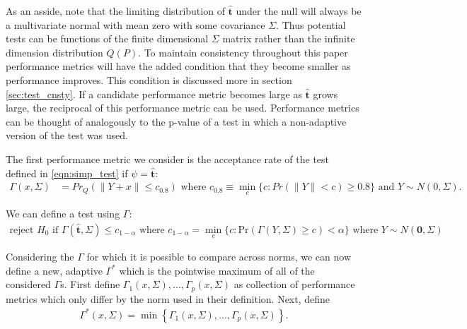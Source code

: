 \documentclass{article}
\newcommand{\vmat}{\Sigma}
\newcommand{\norm}{f}
\newcommand{\tst}{\hat{\boldsymbol{t}}}
\newcommand{\rvt}{Y}
\newcommand{\distv}{Q}
\newcommand{\Gammaf}{\Gamma_{\Sigma}}
\begin{document}
As an asside, note that the limiting distribution of $\tst$ under the null will always be a multivariate normal with mean zero with some covariance $\Sigma$. Thus potential tests can be functions of the finite dimensional $\Sigma$ matrix rather than the infinite dimension distribution $Q(P)$. To maintain consistency throughout this paper performance metrics will have the added condition that they become smaller as performance improves. This condition is discussed more in section \ref{sec:test_cnsty}. If a candidate performance metric becomes large as $\tst$ grows large, the reciprocal of this performance metric can be used. Performance metrics can be thought of analogously to the p-value of a test in which a non-adaptive version of the test was used.

The first performance metric we consider is the acceptance rate of the test defined in  \eqref{eqn:simp_test} if $\psi = \tst$: 
\begin{align}
	\Gamma(x, \Sigma) &= Pr_\distv(\|\rvt + x\| \leq c_{0.8})  \text{ where }  c_{0.8} \equiv \min_{c}\{c : Pr(\|\rvt\| < c) \geq 0.8 \} \text{ and } \rvt \sim N(0, \Sigma). \label{gamma:pow}
\end{align}

We can define a test using $\Gamma$: 
\begin{align*}
	\text{reject } H_0 \text{ if } \Gamma(\tst, \Sigma) \leq c_{1 - \alpha} \text { where } c_{1 - \alpha} = \min_{c}\{c : \text{Pr}(\Gamma(\rvt, \Sigma) \geq c) < \alpha\} \text{ where } \rvt \sim N(\boldsymbol{0}, \Sigma)
\end{align*}

Considering the $\Gamma$ for which it is possible to compare across norms, we can now define a new, adaptive $\Gamma^*$ which is the pointwise maximum of all of the considered $\Gamma$s. First define $\Gamma_{1}(x, \Sigma), \dots, \Gamma_{p}(x, \Sigma)$ as collection of performance metrics which only differ by the norm used in their definition. Next, define
\begin{align*}
	\Gamma^*(x, \Sigma) = \min\left\{\Gamma_{1}(x, \Sigma), \dots, \Gamma_{p}(x, \Sigma)\right\}.
\end{align*}
\end{document}
